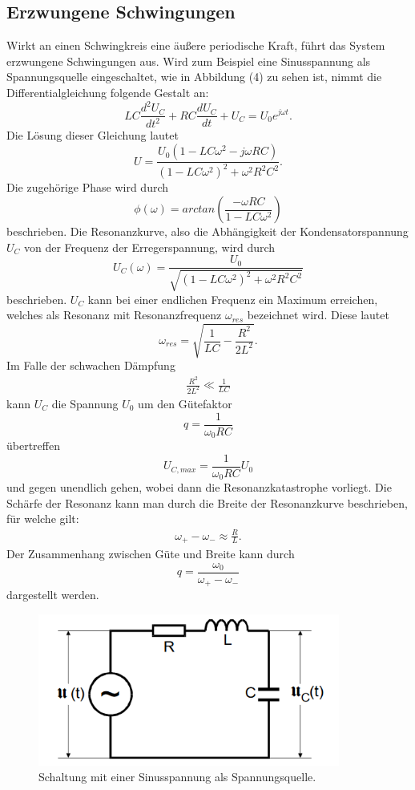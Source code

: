 \subsection{Erzwungene Schwingungen}
Wirkt an einen Schwingkreis eine äußere periodische Kraft, führt das System erzwungene Schwingungen aus.
Wird zum Beispiel eine Sinusspannung als Spannungsquelle eingeschaltet, wie in Abbildung (4) zu sehen ist,
nimmt die Differentialgleichung folgende Gestalt an:
\begin{equation}
LC\frac{d^2 U_C}{dt^2} + RC\frac{d U_C}{dt} + U_C = U_0 e^{j\omega t} .
\end{equation}
Die Lösung dieser Gleichung lautet
\begin{equation}
U = \frac{U_0(1-LC\omega^2 - j\omega RC)}{(1-LC\omega^2)^2 + \omega^2 R^2 C^2} .
\end{equation}
Die zugehörige Phase wird durch 
\begin{equation}
\phi(\omega) = arctan(\frac{-\omega RC}{1-LC\omega^2})
\end{equation}
beschrieben.
Die Resonanzkurve, also die Abhängigkeit der Kondensatorspannung $U_C$ von der Frequenz der Erregerspannung, wird durch
\begin{equation}
U_C(\omega) = \frac{U_0}{\sqrt{(1-LC\omega^2)^2 + \omega^2 R^2 C^2}}
\end{equation}
beschrieben. $U_C$ kann bei einer endlichen Frequenz ein Maximum erreichen, welches als Resonanz mit Resonanzfrequenz $\omega_{res}$ bezeichnet wird.
Diese lautet
\begin{equation}
\omega_{res} = \sqrt{\frac{1}{LC} - \frac{R^2}{2L^2}} .
\end{equation}
Im Falle der schwachen Dämpfung
\begin{align*}
\frac{R^2}{2L^2} \ll \frac{1}{LC}
\end{align*}
kann $U_C$ die Spannung $U_0$ um den Gütefaktor
\begin{equation}
q = \frac{1}{\omega_0 RC}
\end{equation}
\noindent übertreffen 
\begin{equation}
U_{C,max} = \frac{1}{\omega_0 RC}U_0
\end{equation}
und gegen unendlich gehen, wobei dann die Resonanzkatastrophe vorliegt.
Die Schärfe der Resonanz kann man durch die Breite der Resonanzkurve beschrieben, für welche gilt:
\begin{align*}
\omega _+ - \omega _- \approx \frac{R}{L} .
\end{align*}
\noindent Der Zusammenhang zwischen Güte und Breite kann durch
\begin{equation}
q = \frac{\omega_0}{\omega_+ - \omega_-}
\end{equation}
dargestellt werden.
\begin{figure}[H]
  \centering
  \includegraphics[height=5cm]{erzwungen.png}
  \caption{Schaltung mit einer Sinusspannung als Spannungsquelle. \cite[S.6]{kent}}
\end{figure}
